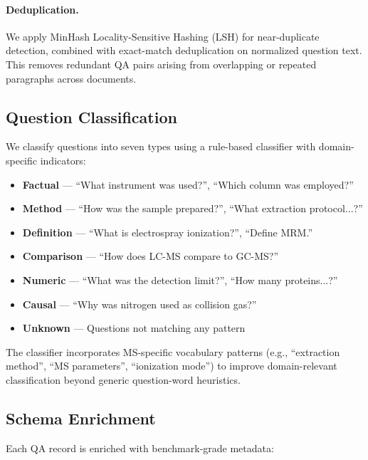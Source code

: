 \documentclass[11pt]{article}
\begin{document}
\paragraph{Deduplication.} We apply MinHash Locality-Sensitive Hashing (LSH) for near-duplicate detection, combined with exact-match deduplication on normalized question text. This removes redundant QA pairs arising from overlapping or repeated paragraphs across documents.

\subsection{Question Classification}
\label{sec:classification}

We classify questions into seven types using a rule-based classifier with domain-specific indicators:

\begin{itemize}[leftmargin=*,itemsep=1pt]
    \item \textbf{Factual} --- ``What instrument was used?'', ``Which column was employed?''
    \item \textbf{Method} --- ``How was the sample prepared?'', ``What extraction protocol...?''
    \item \textbf{Definition} --- ``What is electrospray ionization?'', ``Define MRM.''
    \item \textbf{Comparison} --- ``How does LC-MS compare to GC-MS?''
    \item \textbf{Numeric} --- ``What was the detection limit?'', ``How many proteins...?''
    \item \textbf{Causal} --- ``Why was nitrogen used as collision gas?''
    \item \textbf{Unknown} --- Questions not matching any pattern
\end{itemize}

The classifier incorporates MS-specific vocabulary patterns (e.g., ``extraction method'', ``MS parameters'', ``ionization mode'') to improve domain-relevant classification beyond generic question-word heuristics.

\subsection{Schema Enrichment}
\label{sec:enrichment}

Each QA record is enriched with benchmark-grade metadata:
\end{document}
